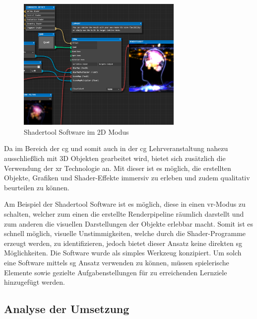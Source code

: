 \documentclass[conference]{IEEEtran}
\begin{document}
\begin{figure}[htbp]
\centerline{\includegraphics[width=8cm]{shadertool_1.png}}
\caption{Shadertool Software im 2D Modus\cite{shadertool}}
\label{shadertool1_fig}
\end{figure}

Da im Bereich der \gls{cg} und somit auch in der \gls{cg} Lehrveranstaltung nahezu ausschließlich mit 3D Objekten gearbeitet wird,
bietet sich zusätzlich die Verwendung der \gls{xr} Technologie an.
Mit dieser ist es möglich, die erstellten Objekte, Grafiken und Shader-Effekte immersiv zu erleben und zudem qualitativ beurteilen zu können.

Am Beispiel der Shadertool Software\cite{shadertool} ist es möglich, diese in einen \gls{vr}-Modus zu schalten, welcher zum einen die erstellte Renderpipeline räumlich darstellt
und zum anderen die visuellen Darstellungen der Objekte erlebbar macht.
Somit ist es schnell möglich, visuelle Unstimmigkeiten, welche durch die Shader-Programme erzeugt werden, zu identifizieren, jedoch bietet dieser Ansatz keine direkten \gls{sg} Möglichkeiten.
Die Software wurde als simples Werkzeug konzipiert.
Um solch eine Software mittels \gls{sg} Ansatz verwenden zu können, müssen spielerische Elemente sowie gezielte Aufgabenstellungen für zu erreichenden Lernziele hinzugefügt werden.

\subsection{Analyse der Umsetzung}
\end{document}
